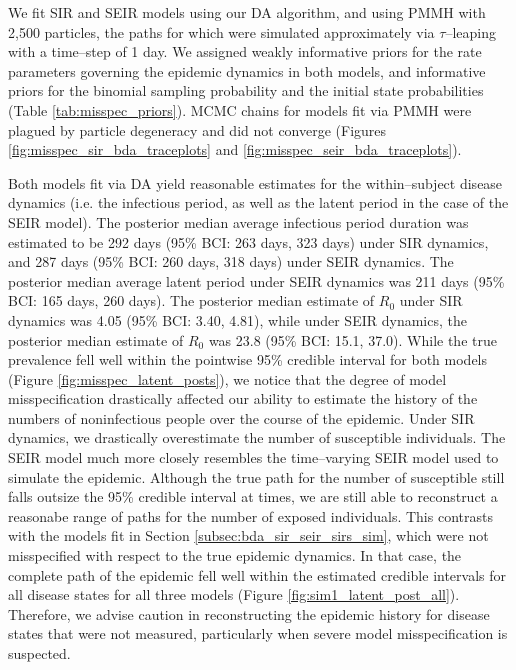 We fit SIR and SEIR models using our DA algorithm, and using PMMH with 2,500 particles, the paths for which were simulated approximately via $ \tau $--leaping with a time--step of 1 day. We assigned weakly informative priors for the rate parameters governing the epidemic dynamics in both models, and informative priors for the binomial sampling probability and the initial state probabilities (Table \ref{tab:misspec_priors}). MCMC chains for models fit via PMMH were plagued by particle degeneracy and did not converge (Figures \ref{fig:misspec_sir_bda_traceplots} and \ref{fig:misspec_seir_bda_traceplots}).

Both models fit via DA yield reasonable estimates for the within--subject disease dynamics (i.e. the infectious period, as well as the latent period in the case of the SEIR model). The posterior median average infectious period duration was estimated to be 292 days (95\% BCI: 263 days, 323 days) under SIR dynamics, and 287 days (95\% BCI: 260 days, 318 days) under SEIR dynamics. The posterior median average latent period under SEIR dynamics was 211 days (95\% BCI: 165 days, 260 days). The posterior median estimate of $ R_0 $ under SIR dynamics was 4.05 (95\% BCI: 3.40, 4.81), while under SEIR dynamics, the posterior median estimate of $ R_0 $ was 23.8 (95\% BCI: 15.1, 37.0). While the true prevalence fell well within the pointwise 95\% credible interval for both models (Figure \ref{fig:misspec_latent_posts}), we notice that the degree of model misspecification drastically affected our ability to estimate the history of the numbers of noninfectious people over the course of the epidemic. Under SIR dynamics, we drastically overestimate the number of susceptible individuals. The SEIR model much more closely resembles the time--varying SEIR model used to simulate the epidemic. Although the true path for the number of susceptible still falls outsize the 95\% credible interval at times, we are still able to reconstruct a reasonabe range of paths for the number of exposed individuals. This contrasts with the models fit in Section \ref{subsec:bda_sir_seir_sirs_sim}, which were not misspecified with respect to the true epidemic dynamics. In that case, the complete path of the epidemic fell well within the estimated credible intervals for all disease states for all three models (Figure \ref{fig:sim1_latent_post_all}). Therefore, we advise caution in  reconstructing the epidemic history for disease states that were not measured, particularly when severe model misspecification is suspected.

